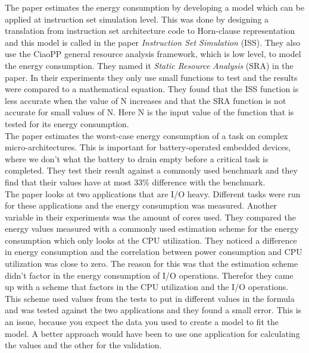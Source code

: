 The paper \cite{liqat2013energy} estimates the energy consumption by developing a model which can be applied at instruction set simulation level. This was done by designing a translation from instruction set architecture code to Horn-clause representation and this model is called in the paper \textit{Instruction Set Simulation} (ISS). They also use the CiaoPP general resource analysis framework, which is low level, to model the energy consumption. They named it \textit{Static Resource Analysis} (SRA) in the paper. In their experiments they only use small functions to test and the results were compared to a mathematical equation. They found that the ISS function is less accurate when the value of N increases and that the SRA function is not accurate for small values of N. Here N is the input value of the function that is tested for its energy consumption.\\

The paper \cite{jayaseelan2006estimating} estimates the worst-case energy consumption of a task on complex micro-architectures. This is important for battery-operated embedded devices, where we don't what the battery to drain empty before a critical task is completed. They test their result against a commonly used benchmark and they find that their values have at most 33\% difference with the benchmark.\\

The paper \cite{ferreiradasilva-iccs-2019} looks at two applications that are I/O heavy. Different tasks were run for these applications and the energy consumption was measured. Another variable in their experiments was the amount of cores used. They compared the energy values measured with a commonly used estimation scheme for the energy consumption which only looks at the CPU utilization. They noticed a difference in energy consumption and the correlation between power consumption and CPU utilization was close to zero. The reason for this was that the estimation scheme didn't factor in the energy consumption of I/O operations. Therefor they came up with a scheme that factors in the CPU utilization and the I/O operations. This scheme used values from the tests to put in different values in the formula and was tested against the two applications and they found a small error. This is an issue, because you expect the data you used to create a model to fit the model. A better approach would have been to use one application for calculating the values and the other for the validation.\\

